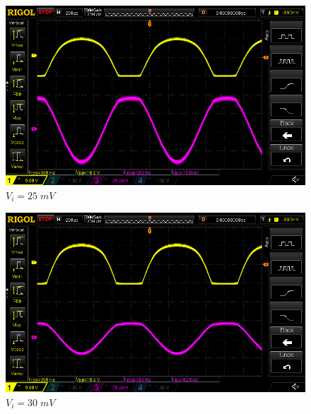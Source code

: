 \documentclass[uplatex,a4paper,11pt,oneside,openany]{jsbook}
\begin{document}
\begin{spacing}{0.71}
\begin{multicols}{2}
  \begin{figure}[H]
     \centering
      \includegraphics[keepaspectratio, scale=0.28, angle=0]
                  {rigol/figs/IOCharM1Y1_2kR/25mV.png}
                  \caption{$V_i=25\;mV$}
                  \label{fig:ioc25}
  \end{figure}

  \begin{figure}[H]
     \centering
      \includegraphics[keepaspectratio, scale=0.28, angle=0]
                {rigol/figs/IOCharM1Y1_2kR/30mV.png}
                \caption{$V_i=30\;mV$}
                \label{fig:ioc30}
  \end{figure}
\end{multicols}


\end{spacing}
\end{document}
